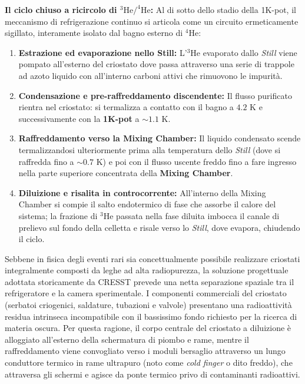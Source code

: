 \noindent
\textbf{Il ciclo chiuso a ricircolo di $^3\text{He}/^4\text{He}$:} 
Al di sotto dello stadio della 1K-pot, il meccanismo di refrigerazione continuo si articola come un circuito ermeticamente sigillato, interamente isolato dal bagno esterno di $^4\text{He}$:
\begin{enumerate}
    \item \textbf{Estrazione ed evaporazione nello Still:} L'$^3\text{He}$ evaporato dallo \textit{Still} viene pompato all'esterno del criostato dove passa attraverso una serie di trappole ad azoto liquido con all'interno carboni attivi che rimuovono le impurità.
    \item \textbf{Condensazione e pre-raffreddamento discendente:} Il flusso purificato rientra nel criostato: si termalizza a contatto con il bagno a $4.2\text{ K}$ e successivamente con la \textbf{1K-pot} a $\sim 1.1\text{ K}$.
    \item \textbf{Raffreddamento verso la Mixing Chamber:} Il liquido condensato scende termalizzandosi ulteriormente prima alla temperatura dello \textit{Still} (dove si raffredda fino a $\sim 0.7\text{ K}$) e poi con il flusso uscente freddo fino a fare ingresso nella parte superiore concentrata della \textbf{Mixing Chamber}.
    \item \textbf{Diluizione e risalita in controcorrente:} All'interno della Mixing Chamber si compie il salto endotermico di fase che assorbe il calore del sistema; la frazione di $^3\text{He}$ passata nella fase diluita imbocca il canale di prelievo sul fondo della celletta e risale verso lo \textit{Still}, dove evapora, chiudendo il ciclo.
\end{enumerate}

\noindent
Sebbene in fisica degli eventi rari sia concettualmente possibile realizzare criostati integralmente composti da leghe ad alta radiopurezza, la soluzione progettuale adottata storicamente da CRESST prevede una netta separazione spaziale tra il refrigeratore e la camera sperimentale. I componenti commerciali del criostato (serbatoi criogenici, saldature, tubazioni e valvole) presentano una radioattività residua intrinseca incompatibile con il bassissimo fondo richiesto per la ricerca di materia oscura. Per questa ragione, il corpo centrale del criostato a diluizione è alloggiato all'esterno della schermatura di piombo e rame, mentre il raffreddamento viene convogliato verso i moduli bersaglio attraverso un lungo conduttore termico in rame ultrapuro (noto come \textit{cold finger} o dito freddo), che attraversa gli schermi e agisce da ponte termico privo di contaminanti radioattivi.

